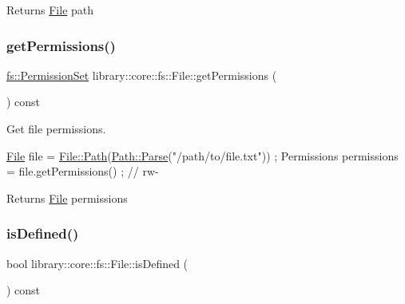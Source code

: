 \begin{DoxyReturn}{Returns}
\hyperlink{classlibrary_1_1core_1_1fs_1_1_file}{File} path 
\end{DoxyReturn}
\mbox{\label{classlibrary_1_1core_1_1fs_1_1_file_a0addf18f7510955e48fdef2416b98423}} 
\subsubsection{\texorpdfstring{get\+Permissions()}{getPermissions()}}
{\footnotesize\ttfamily \hyperlink{classlibrary_1_1core_1_1fs_1_1_permission_set}{fs\+::\+Permission\+Set} library\+::core\+::fs\+::\+File\+::get\+Permissions (\begin{DoxyParamCaption}{ }\end{DoxyParamCaption}) const}



Get file permissions. 


\begin{DoxyCode}
\hyperlink{classlibrary_1_1core_1_1fs_1_1_file_a6f3f0d79545ac9984c6f49432f0c6c39}{File} file = \hyperlink{classlibrary_1_1core_1_1fs_1_1_file_a72d6cdf8bb7e299889c6149e2b8a6cc7}{File::Path}(\hyperlink{classlibrary_1_1core_1_1fs_1_1_path_a6ba644b6609507e724c217bf2020f5ae}{Path::Parse}(\textcolor{stringliteral}{"/path/to/file.txt"})) ;
Permissions permissions = file.getPermissions() ; \textcolor{comment}{// rw-}
\end{DoxyCode}


\begin{DoxyReturn}{Returns}
\hyperlink{classlibrary_1_1core_1_1fs_1_1_file}{File} permissions 
\end{DoxyReturn}
\mbox{\label{classlibrary_1_1core_1_1fs_1_1_file_a2044eecd956aaf55b4c55872485e1bf9}} 
\subsubsection{\texorpdfstring{is\+Defined()}{isDefined()}}
{\footnotesize\ttfamily bool library\+::core\+::fs\+::\+File\+::is\+Defined (\begin{DoxyParamCaption}{ }\end{DoxyParamCaption}) const}




